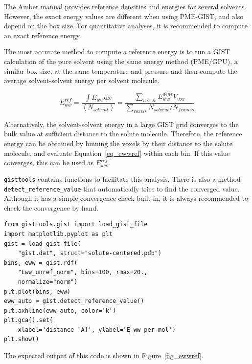 \documentclass[9pt,tutorial]{livecoms}
\newcommand{\software}{\texttt}
\newcommand\inlinecode{\texttt}
\begin{document}
The Amber manual provides reference densities and energies for several solvents.
However, the exact energy values are different when using PME-GIST, and also depend on the box size.
For quantitative analyses, it is recommended to compute an exact reference energy.

The most accurate method to compute a reference energy is to run a GIST calculation of the pure solvent using the same energy method (PME/GPU), a similar box size, at the same temperature and pressure and then compute the average solvent-solvent energy per solvent molecule.

\begin{equation}
\label{eq_ewwref}
E_{ww}^\textit{ref} = \frac{\int{E_{ww}} \mathrm{d}x}{\left<N_\textit{solvent}\right>}
  = \frac{\sum_\textit{voxels}E_{ww}^\textit{dens} V_\textit{vox}}{\sum_\textit{voxels}{N_\textit{solvent}} / N_\textit{frames}}
\end{equation}

Alternatively, the solvent-solvent energy in a large GIST grid converges to the bulk value at sufficient distance to the solute molecule.
Therefore, the reference energy can be obtained by binning the voxels by their distance to the solute molecule, and evaluate Equation~\ref{eq_ewwref} within each bin.
If this value converges, this can be used as $E_{ww}^\textit{ref}$.

\software{gisttools} contains functions to facilitate this analysis.
There is also a method \inlinecode{detect\_reference\_value} that automatically tries to find the converged value.
Although it has a simple convergence check built-in, it is always recommended to check the convergence by hand.

\begin{lstlisting}[style=python]
from gisttools.gist import load_gist_file
import matplotlib.pyplot as plt
gist = load_gist_file(
    "gist.dat", struct="solute-centered.pdb")
bins, eww = gist.rdf(
    "Eww_unref_norm", bins=100, rmax=20.,
    normalize="norm")
plt.plot(bins, eww)
eww_auto = gist.detect_reference_value()
plt.axhline(eww_auto, color='k')
plt.gca().set(
    xlabel='distance [A]', ylabel='E_ww per mol')
plt.show()
\end{lstlisting}

The expected output of this code is shown in Figure~\ref{fig_ewwref}.
\end{document}
